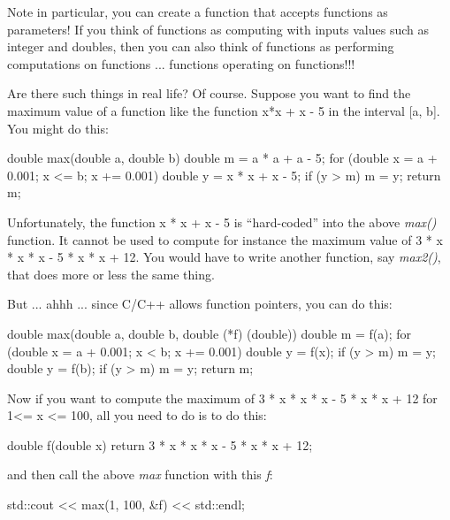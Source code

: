 Note in particular, you can create a function that accepts functions as
parameters! If you think of functions as computing with inputs values
such as integer and doubles, then you can also think of functions as
performing computations on functions ... functions operating on
functions!!!

Are there such things in real life? Of course. Suppose you want to find
the maximum value of a function like the function x*x + x - 5 in the
interval [a, b]. You might do this:

\begin{consolethree}[escapeinside=||]
double max(double a, double b)
{
    double m = a * a + a - 5;
    for (double x = a + 0.001; x <= b; x += 0.001)
    {
        double y = x * x + x - 5;
        if (y > m)
        {
            m = y;
        }
    }
    return m;
}
\end{consolethree}

Unfortunately, the function x * x + x - 5 is ``hard-coded'' into the
above \textit{max()} function. It cannot be used to compute for instance
the maximum value of 3 * x * x * x - 5 * x * x + 12. You would have to
write another function, say \textit{max2()}, that does more or less the
same thing.

But ... ahhh ... since C/C++ allows function pointers, you can
do this:

\begin{consolethree}[escapeinside=||]
double max(double a, double b, double (*f) (double))
{
    double m = f(a);
    for (double x = a + 0.001; x < b; x += 0.001)
    {
        double y = f(x);
        if (y > m)
        {
            m = y;
        }
    }
    double y = f(b);
    if (y > m)
    {
        m = y;
    }
    return m;
}
\end{consolethree}

Now if you want to compute the maximum of 3 * x * x * x - 5 * x * x +
12 for 1<= x <= 100, all you need to do is to do this:

\begin{consolethree}[escapeinside=||]
double f(double x)
{
    return 3 * x * x * x - 5 * x * x + 12;
}
\end{consolethree}

and then call the above \textit{max} function with this \textit{f}:

\begin{consolethree}[escapeinside=||]
std::cout << max(1, 100, &f) << std::endl;
\end{consolethree}

